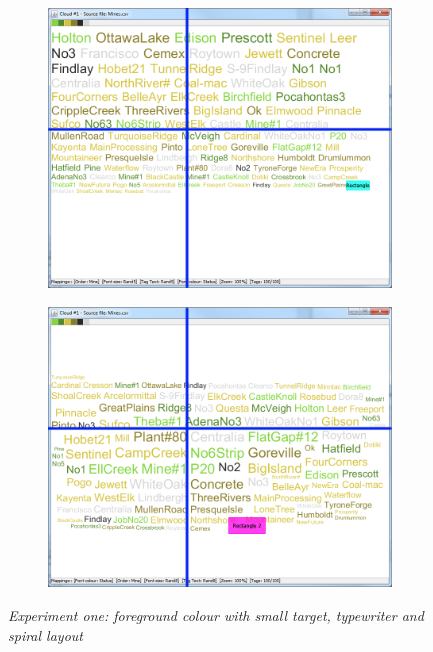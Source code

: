 \begin{figure}[!htb]
\begin{subfigure}{.5\textwidth}
  \includegraphics[scale=0.25]{Experiment1/Trial4/C2S1L2.png}
\end{subfigure}%
\begin{subfigure}{.5\textwidth}
  \centering
 \includegraphics[scale=0.25]{Experiment1/Trial4/C2S1L1.png}
\end{subfigure}
\caption{\textit{Experiment one: foreground colour with small target, typewriter and spiral layout}}
\label{fig:target2}
\end{figure}

